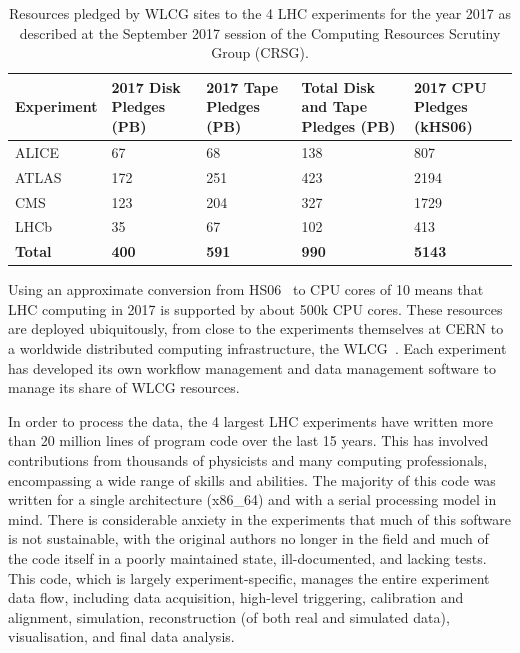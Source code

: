 \documentclass[12pt,a4paper]{article}
\begin{document}
\begin{table}
    \centering
\begin{tabular}{lp{}p{}p{}p{}}
\hline
\textbf{Experiment} & \textbf{2017 Disk Pledges (PB)} & \textbf{2017 Tape Pledges (PB)} & \textbf{Total Disk and Tape Pledges (PB)} & \textbf{2017 CPU Pledges (kHS06)}\\
\hline
ALICE & 67 & 68 & 138 & 807\\
ATLAS & 172 & 251 & 423 & 2194\\
CMS & 123 & 204 & 327 & 1729\\
LHCb & 35 & 67 & 102 & 413\\
\textbf{Total} & \textbf{400} & \textbf{591} & \textbf{990} &
\textbf{5143}\\
\hline
\end{tabular}
    \caption{Resources pledged by WLCG sites to the 4 LHC experiments for
the year 2017 as described at the September 2017 session of the
Computing Resources Scrutiny Group (CRSG).}
    \label{tab:crsg2017}
\end{table}

Using an approximate conversion from HS06~\cite{HS06} to CPU cores of 10
means that LHC computing in 2017 is supported by about 500k CPU cores.
These resources are deployed ubiquitously, from close to the experiments
themselves at CERN to a worldwide distributed computing infrastructure,
the WLCG~\cite{WLCG}. Each experiment has developed its own workflow management and
data management software to manage its share of WLCG resources.

In order to process the data, the 4 largest LHC experiments have written
more than 20 million lines of program code over the last 15 years. This
has involved contributions from thousands of physicists and many
computing professionals, encompassing a wide range of skills and
abilities. The majority of this code was written for a single
architecture (x86\_64) and with a serial processing model in mind. There
is considerable anxiety in the experiments that much of this software is
not sustainable, with the original authors no longer in the field and
much of the code itself in a poorly maintained state, ill-documented, and
lacking tests. This code, which is largely experiment-specific, manages
the entire experiment data flow, including data acquisition, high-level
triggering, calibration and alignment, simulation, reconstruction (of
both real and simulated data), visualisation, and final data analysis.
\end{document}
